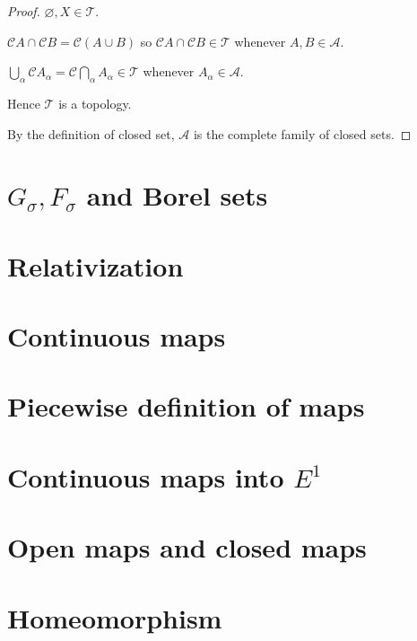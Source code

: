 \begin{proof}
	\( \varnothing, X \in \mathscr{T} \).

	\( \mathscr{C}A \cap \mathscr{C}B = \mathscr{C}(A \cup B) \) so \( \mathscr{C}A \cap \mathscr{C}B \in \mathscr{T} \) whenever \( A, B \in \mathscr{A} \).

	\( \bigcup_{\alpha} \mathscr{C}A_{\alpha} = \mathscr{C}\bigcap_{\alpha}A_{\alpha} \in \mathscr{T} \) whenever \( A_{\alpha} \in \mathscr{A} \).

	Hence \( \mathscr{T} \) is a topology.

	By the definition of closed set, \( \mathscr{A} \) is the complete family of closed sets.
\end{proof}

\section{\( G_{\sigma}, F_{\sigma} \) and Borel sets}

\section{Relativization}

\section{Continuous maps}

\section{Piecewise definition of maps}

\section{Continuous maps into \( E^{1} \)}

\section{Open maps and closed maps}

\section{Homeomorphism}

